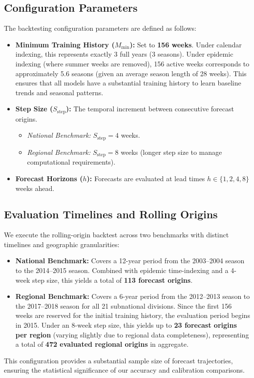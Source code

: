 \subsection{Configuration Parameters}
The backtesting configuration parameters are defined as follows:
\begin{itemize}
    \item \textbf{Minimum Training History ($M_{\text{min}}$):} Set to \textbf{156 weeks}. Under calendar indexing, this represents exactly 3 full years (3 seasons). Under epidemic indexing (where summer weeks are removed), 156 active weeks corresponds to approximately 5.6 seasons (given an average season length of 28 weeks). This ensures that all models have a substantial training history to learn baseline trends and seasonal patterns.
    \item \textbf{Step Size ($S_{\text{step}}$):} The temporal increment between consecutive forecast origins.
    \begin{itemize}
        \item \textit{National Benchmark:} $S_{\text{step}} = 4$ weeks.
        \item \textit{Regional Benchmark:} $S_{\text{step}} = 8$ weeks (longer step size to manage computational requirements).
    \end{itemize}
    \item \textbf{Forecast Horizons ($h$):} Forecasts are evaluated at lead times $h \in \{1, 2, 4, 8\}$ weeks ahead.
\end{itemize}

\subsection{Evaluation Timelines and Rolling Origins}
We execute the rolling-origin backtest across two benchmarks with distinct timelines and geographic granularities:
\begin{itemize}
    \item \textbf{National Benchmark:} Covers a 12-year period from the 2003--2004 season to the 2014--2015 season. Combined with epidemic time-indexing and a 4-week step size, this yields a total of \textbf{113 forecast origins}.
    \item \textbf{Regional Benchmark:} Covers a 6-year period from the 2012--2013 season to the 2017--2018 season for all 21 subnational divisions. Since the first 156 weeks are reserved for the initial training history, the evaluation period begins in 2015. Under an 8-week step size, this yields up to \textbf{23 forecast origins per region} (varying slightly due to regional data completeness), representing a total of \textbf{472 evaluated regional origins} in aggregate.
\end{itemize}
This configuration provides a substantial sample size of forecast trajectories, ensuring the statistical significance of our accuracy and calibration comparisons.

